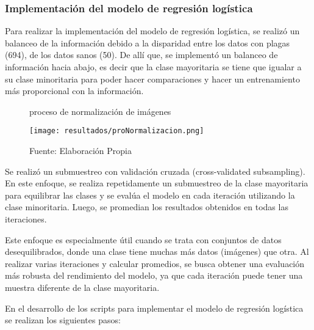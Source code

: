 \newpage

\subsubsection{Implementación del modelo de regresión logística}

Para realizar la implementación del modelo de regresión logística, se realizó un balanceo de la información debido a la disparidad entre los datos con plagas (694), de los datos sanos (50). De allí que, se implementó un balanceo de información hacia abajo, es decir que la clase mayoritaria se tiene que igualar a su clase minoritaria para poder hacer comparaciones y hacer un entrenamiento más proporcional con la información.

\begin{figure}[h]
\centering
\caption{proceso de normalización de imágenes}
\texttt{[image: resultados/proNormalizacion.png]}
\caption*{\footnotesize Fuente: Elaboración Propia}
\label{fig:figuraProNormalizacion}
\end{figure}

Se realizó un submuestreo con validación cruzada (cross-validated subsampling). En este enfoque, se realiza repetidamente un submuestreo de la clase mayoritaria para equilibrar las clases y se evalúa el modelo en cada iteración utilizando la clase minoritaria. Luego, se promedian los resultados obtenidos en todas las iteraciones.

Este enfoque es especialmente útil cuando se trata con conjuntos de datos desequilibrados, donde una clase tiene muchas más datos (imágenes) que otra. Al realizar varias iteraciones y calcular promedios, se busca obtener una evaluación más robusta del rendimiento del modelo, ya que cada iteración puede tener una muestra diferente de la clase mayoritaria.

En el desarrollo de los scripts para implementar el modelo de regresión logística se realizan los siguientes pasos:

\newpage

